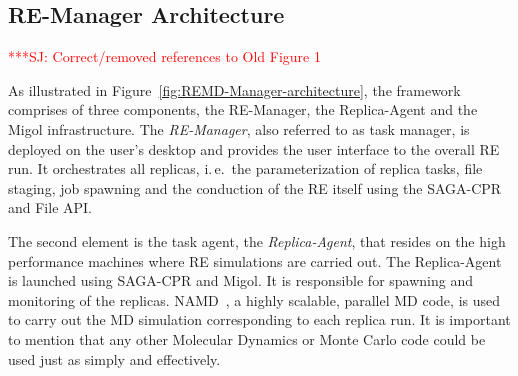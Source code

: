 \documentclass{rspublic}
\newcommand{\alnote}[1]{ {\textcolor{blue} { ***AL: #1 }}}
\newcommand{\jhanote}[1]{ {\textcolor{red} { ***SJ: #1 }}}
\newcommand{\alnote}[1]{}
\newcommand{\jhanote}[1]{}
\newcommand{\replicaagent}[1]{Replica-Agent }
\begin{document}
\subsection{RE-Manager Architecture}      


\jhanote{Correct/removed references to Old Figure 1}

As illustrated in Figure~\ref{fig:REMD-Manager-architecture}, the
framework comprises of three components, the RE-Manager,
the Replica-Agent and the Migol infrastructure. 
The  \emph{RE-Manager}, also referred to as task manager,
is deployed on the user's desktop and provides the user interface 
to the overall RE run. It orchestrates all replicas, i.\,e.\ the 
parameterization of replica  tasks, file staging, job spawning 
and the conduction of the RE itself using the SAGA-CPR
and File API.                                                                

The second element is the task agent, the \textit{Replica-Agent},
that resides on the high performance machines where RE simulations
are carried out. The \replicaagent\ is launched using SAGA-CPR and Migol.
It is responsible for spawning and monitoring of the replicas. 
NAMD~\citep{Phillips:2005gd}, a highly scalable, parallel MD
code, is used to carry out the MD simulation corresponding to each
replica run. It is important to mention that any other Molecular Dynamics 
or Monte Carlo code could be used just as simply and effectively.
\end{document}

